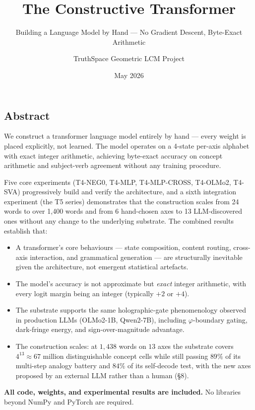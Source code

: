 \documentclass[
  twocolumn,
  10pt,
  a4paper]{article}
\title{The Constructive Transformer}
\subtitle{Building a Language Model by Hand --- No Gradient Descent,
Byte-Exact Arithmetic}
\author{TruthSpace Geometric LCM Project}
\date{May 2026}
\providecommand{\tightlist}{%
  \setlength{\itemsep}{0pt}\setlength{\parskip}{0pt}}
\begin{document}
\onecolumn
\maketitle

{
\setcounter{tocdepth}{3}
\tableofcontents
}
\twocolumn
\hypertarget{abstract}{%
\subsection{Abstract}\label{abstract}}

We construct a transformer language model entirely by hand --- every
weight is placed explicitly, not learned. The model operates on a
4-state per-axis alphabet with exact integer arithmetic, achieving
byte-exact accuracy on concept arithmetic and subject-verb agreement
without any training procedure.

Five core experiments (T4-NEG0, T4-MLP, T4-MLP-CROSS, T4-OLMo2, T4-SVA)
progressively build and verify the architecture, and a sixth integration
experiment (the T5 series) demonstrates that the construction scales
from 24 words to over 1,400 words and from 6 hand-chosen axes to 13
LLM-discovered ones without any change to the underlying substrate. The
combined results establish that:

\begin{itemize}
\tightlist
\item
  A transformer's core behaviours --- state composition, content
  routing, cross-axis interaction, and grammatical generation --- are
  structurally inevitable given the architecture, not emergent
  statistical artefacts.
\item
  The model's accuracy is not approximate but \emph{exact} integer
  arithmetic, with every logit margin being an integer (typically \(+2\)
  or \(+4\)).
\item
  The substrate supports the same holographic-gate phenomenology
  observed in production LLMs (OLMo2-1B, Qwen2-7B), including
  \(\varphi\)-boundary gating, dark-fringe energy, and
  sign-over-magnitude advantage.
\item
  The construction scales: at \(1{,}438\) words on \(13\) axes the
  substrate covers \(4^{13} \approx 67\) million distinguishable concept
  cells while still passing \(89\%\) of its multi-step analogy battery
  and \(84\%\) of its self-decode test, with the new axes proposed by an
  external LLM rather than a human (§8).
\end{itemize}

\textbf{All code, weights, and experimental results are included.} No
libraries beyond NumPy and PyTorch are required.
\end{document}
